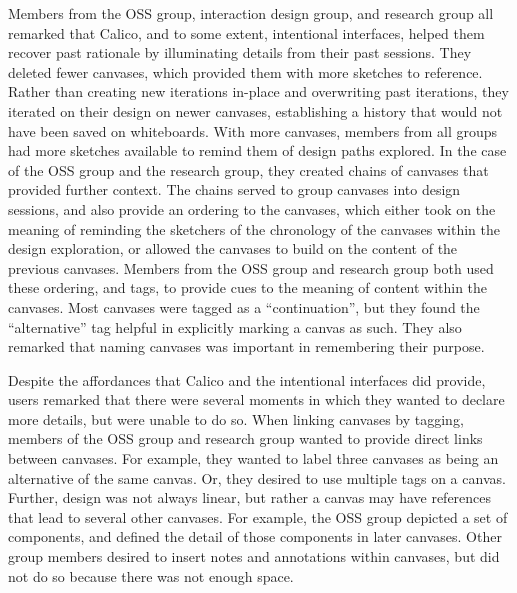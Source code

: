 Members from the OSS group, interaction design group, and research group all remarked that Calico, and to some extent, intentional interfaces, helped them recover past rationale by illuminating details from their past sessions. They deleted fewer canvases, which provided them with more sketches to reference. Rather than creating new iterations in-place and overwriting past iterations, they iterated on their design on newer canvases, establishing a history that would not have been saved on whiteboards. With more canvases, members from all groups had more sketches available to remind them of design paths explored. In the case of the OSS group and the research group, they created chains of canvases that provided further context. The chains served to group canvases into design sessions, and also provide an ordering to the canvases, which either took on the meaning of reminding the sketchers of the chronology of the canvases within the design exploration, or allowed the canvases to build on the content of the previous canvases. Members from the OSS group and research group both used these ordering, and tags, to provide cues to the meaning of content within the canvases. Most canvases were tagged as a ``continuation'', but they found the ``alternative'' tag helpful in explicitly marking a canvas as such. They also remarked that naming canvases was important in remembering their purpose.


Despite the affordances that Calico and the intentional interfaces did provide, users remarked that there were several moments in which they wanted to declare more details, but were unable to do so. When linking canvases by tagging, members of the OSS group and research group wanted to provide direct links between canvases. For example, they wanted to label three canvases as being an alternative of the same canvas. Or, they desired to use multiple tags on a canvas. Further, design was not always linear, but rather a canvas may have references that lead to several other canvases. For example, the OSS group depicted a set of components, and defined the detail of those components in later canvases. Other group members desired to insert notes and annotations within canvases, but did not do so because there was not enough space.

